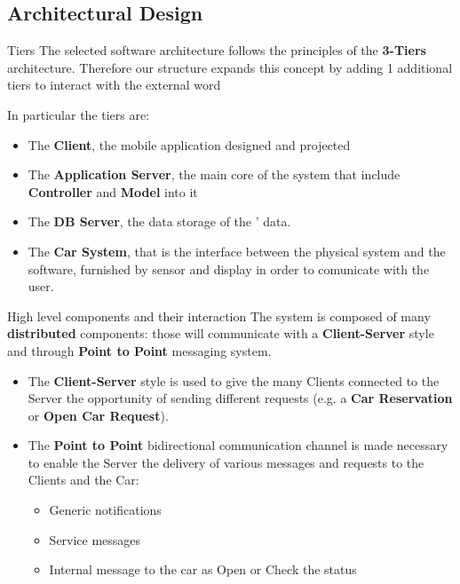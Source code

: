 \documentclass{../Common/Structure/pdf_presentation}
\begin{document}
	\subsection{Architectural Design}
	\begin{frame}{Tiers}
		The selected software architecture follows the principles of the \textbf{3-Tiers} architecture. Therefore our structure expands this concept by adding 1 additional tiers to interact with the external word\par
		In particular the tiers are:
		\begin{itemize}
			\item The \textbf{Client}, the mobile application designed and projected
			\item The \textbf{Application Server}, the main core of the system that include \textbf{Controller} and \textbf{Model} into it
			\item The \textbf{DB Server}, the data storage of the \PowerEnJoy{}' data.
			\item The \textbf{Car System}, that is the interface between the physical system and the software, furnished by sensor and display in order to comunicate with the user.
		\end{itemize}
	\end{frame}
	\begin{frame}{High level components and their interaction}
		The system is composed of many \textbf{distributed} components: those will communicate with a \textbf{Client-Server} style and through \textbf{Point to Point} messaging system.
		\begin{itemize}
			\item The \textbf{Client-Server} style is used to give the many Clients connected to the Server the opportunity of sending different requests (e.g. a \textbf{Car Reservation} or \textbf{Open Car Request}).
			\item The \textbf{Point to Point} bidirectional communication channel is made necessary to enable the Server the delivery of various messages and requests to the Clients and the Car:
			\begin{itemize}
				\item Generic notifications
				\item Service messages
				\item Internal message to the car as Open or Check the status
			\end{itemize}
		\end{itemize}
	\end{frame}
\end{document}
